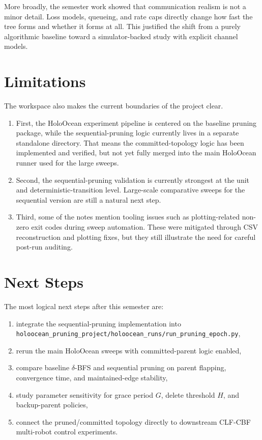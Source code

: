 \documentclass[11pt,a4paper]{article}
\begin{document}
More broadly, the semester work showed that communication realism is not a minor detail. Loss models, queueing, and rate caps directly change how fast the tree forms and whether it forms at all. This justified the shift from a purely algorithmic baseline toward a simulator-backed study with explicit channel models.

\section{Limitations}

The workspace also makes the current boundaries of the project clear.
\begin{enumerate}
  \item First, the HoloOcean experiment pipeline is centered on the baseline pruning package, while the sequential-pruning logic currently lives in a separate standalone directory. That means the committed-topology logic has been implemented and verified, but not yet fully merged into the main HoloOcean runner used for the large sweeps.
  \item Second, the sequential-pruning validation is currently strongest at the unit and deterministic-transition level. Large-scale comparative sweeps for the sequential version are still a natural next step.
  \item Third, some of the notes mention tooling issues such as plotting-related non-zero exit codes during sweep automation. These were mitigated through CSV reconstruction and plotting fixes, but they still illustrate the need for careful post-run auditing.
\end{enumerate}

\section{Next Steps}

The most logical next steps after this semester are:
\begin{enumerate}
  \item integrate the sequential-pruning implementation into \texttt{holoocean\_pruning\_project/holoocean\_runs/run\_pruning\_epoch.py},
  \item rerun the main HoloOcean sweeps with committed-parent logic enabled,
  \item compare baseline \(\delta\)-BFS and sequential pruning on parent flapping, convergence time, and maintained-edge stability,
  \item study parameter sensitivity for grace period \(G\), delete threshold \(H\), and backup-parent policies,
  \item connect the pruned/committed topology directly to downstream CLF-CBF multi-robot control experiments.
\end{enumerate}
\end{document}
